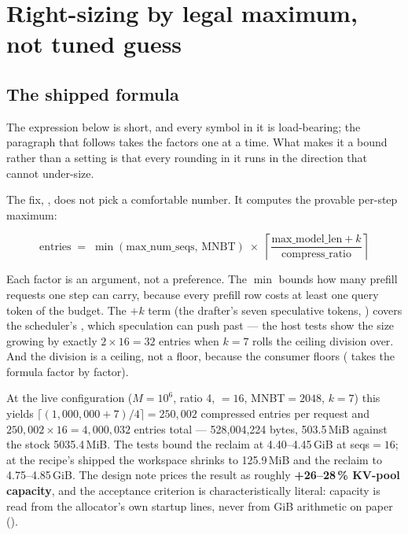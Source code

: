 \section{Right-sizing by legal maximum, not tuned guess}
\label{sec:proof-rightsizing}

\subsection{The shipped formula}

The expression below is short, and every symbol in it is load-bearing; the
paragraph that follows takes the factors one at a time. What makes it a bound
rather than a setting is that every rounding in it runs in the direction that
cannot under-size.

The fix, , does not pick a
comfortable number. It computes the provable per-step maximum:

\begin{equation*}
\text{entries} \;=\; \min(\text{max\_num\_seqs},\, \text{MNBT})
\;\times\; \left\lceil
\frac{\text{max\_model\_len} + k}{\text{compress\_ratio}} \right\rceil
\end{equation*}

Each factor is an argument, not a preference. The $\min$ bounds how many
prefill requests one step can carry, because every prefill row costs at least
one query token of the  budget. The $+k$ term
(the drafter's seven speculative tokens, ) covers the scheduler's
, which speculation can push past
 --- the host tests show the size growing by exactly
$2 \times 16 = 32$ entries when $k{=}7$ rolls the ceiling division over. And
the division is a ceiling, not a floor, because the consumer floors
( takes the formula factor by factor).

At the live configuration ($M{=}10^6$, ratio 4, ${=}16$,
MNBT${=}2048$, $k{=}7$) this yields
$\lceil (1{,}000{,}000+7)/4 \rceil = 250{,}002$ compressed entries per request
and $250{,}002 \times 16 = 4{,}000{,}032$ entries total ---
528{,}004{,}224 bytes, 503.5\,MiB against the stock 5035.4\,MiB. The tests
bound the reclaim at 4.40--4.45\,GiB at seqs${=}16$; at the recipe's shipped
 the workspace shrinks to 125.9\,MiB and the reclaim to
4.75--4.85\,GiB. The design note prices the result as roughly
\textbf{+26--28\,\% KV-pool capacity}, and the acceptance criterion is
characteristically literal: capacity is read from the allocator's own startup
lines, never from GiB arithmetic on paper
().

